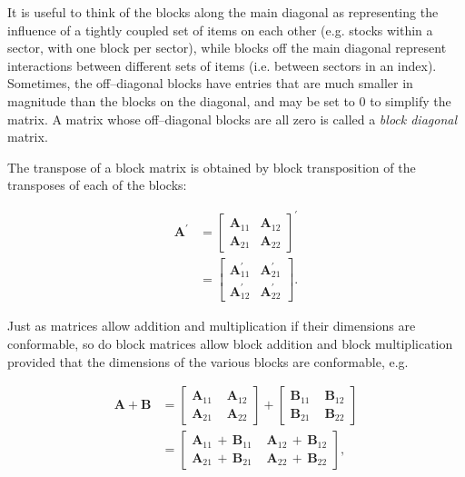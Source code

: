 \documentclass[graybox,envcountchap,sectrefs]{svmono}\usepackage[]{graphicx}\usepackage[]{xcolor}
\begin{document}
\begin{appendices}
It is useful to think of the blocks along the main diagonal as representing
the influence of a tightly coupled set of items on each other (e.g.
stocks within a sector, with one block per sector), while blocks off
the main diagonal represent interactions between different sets of
items (i.e. between sectors in an index). Sometimes, the off--diagonal
blocks have entries that are much smaller in magnitude than the blocks
on the diagonal, and may be set to 0 to simplify the matrix. A matrix
whose off--diagonal blocks are all zero is called a \emph{block diagonal}
matrix.

The transpose of a block matrix is obtained by block transposition
of the transposes of each of the blocks:

\begin{align}
\mathrm{\mathbf{A}}^{\prime} & =\left[\begin{array}{c|c}
\mathrm{\mathbf{A}}_{11} & \mathrm{\mathbf{A}}_{12}\\
\hline \mathrm{\mathbf{A}}_{21} & \mathrm{\mathbf{A}}_{22}
\end{array}\right]^{\prime}\nonumber \\[0.5em]
 & =\left[\begin{array}{c|c}
\mathrm{\mathbf{A}}_{11}^{\prime} & \mathrm{\mathbf{A}}_{21}^{\prime}\\
\hline \mathrm{\mathbf{A}}_{12}^{\prime} & \mathrm{\mathbf{A}}_{22}^{\prime}
\end{array}\right].\label{eq:BlockTranspose}
\end{align}

Just as matrices allow addition and multiplication if their dimensions
are conformable, so do block matrices allow block addition and block
multiplication provided that the dimensions of the various blocks
are conformable, e.g. 

\begin{align}
\mathrm{\mathbf{A+B}} & =\left[\begin{array}{c|c}
\mathrm{\mathbf{A}}_{11}\, & \,\mathrm{\mathbf{A}}_{12}\\
\hline \mathrm{\mathbf{A}}_{21}\, & \,\mathrm{\mathbf{A}}_{22}
\end{array}\right]+\left[\begin{array}{c|c}
\mathrm{\mathbf{B}}_{11}\, & \,\mathrm{\mathbf{B}}_{12}\\
\hline \mathrm{\mathbf{B}}_{21}\, & \,\mathrm{\mathbf{B}}_{22}
\end{array}\right]\nonumber \\[0.5em]
 & =\left[\begin{array}{c|c}
\mathrm{\mathbf{A}}_{11}\,+\,\mathrm{\mathbf{B}}_{11}\, & \,\mathrm{\mathbf{A}}_{12}\,+\,\mathrm{\mathbf{B}}_{12}\\
\hline \mathrm{\mathbf{A}}_{21}\,+\,\mathrm{\mathbf{B}}_{21}\, & \,\mathbf{A}_{22}\,+\,\mathrm{\mathbf{B}}_{22}
\end{array}\right],\label{eq:BlockMatrixAddition}
\end{align}


\end{appendices}
\end{document}
